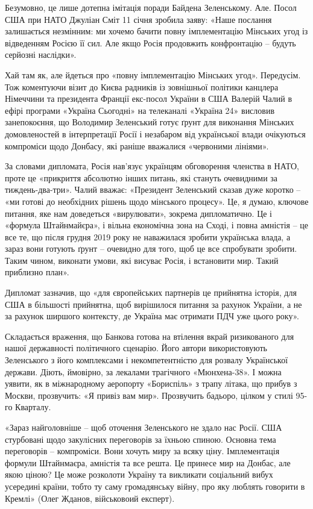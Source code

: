 Безумовно, це лише дотепна імітація поради Байдена Зеленському. Але. Посол США
при НАТО Джуліан Сміт 11 січня зробила заяву: «Наше послання залишається
незмінним: ми хочемо бачити повну імплементацію Мінських угод із відведенням
Росією її сил. Але якщо Росія продовжить конфронтацію – будуть серйозні
наслідки».

Хай там як, але йдеться про «повну імплементацію Мінських угод». Передусім. Тож
коментуючи візит до Києва радників із зовнішньої політики канцлера Німеччини та
президента Франції екс-посол України в США Валерій Чалий в ефірі програми
«Україна Сьогодні» на телеканалі «Україна 24» висловив занепокоєння, що
Володимир Зеленський готує ґрунт для виконання Мінських домовленостей в
інтерпретації Росії і незабаром від української влади очікуються компроміси
щодо Донбасу, які раніше вважалися «червоними лініями».

За словами дипломата, Росія нав’язує українцям обговорення членства в НАТО,
проте це «прикриття абсолютно інших питань, які стануть очевидними за
тиждень-два-три». Чалий вважає: «Президент Зеленський сказав дуже коротко – «ми
готові до необхідних рішень щодо мінського процесу». Це, я думаю, ключове
питання, яке нам доведеться «вирулювати», зокрема дипломатично. Це і «формула
Штайнмайєра», і вільна економічна зона на Сході, і повна амністія – це все те,
що після грудня 2019 року не наважилася зробити українська влада, а зараз вони
готують ґрунт – очевидно для того, щоб це все спробувати зробити. Таким чином,
виконати умови, які висуває Росія, і встановити мир. Такий приблизно план».

Дипломат зазначив, що «для європейських партнерів це прийнятна історія, для США
в більшості прийнятна, щоб вирішилося питання за рахунок України, а не за
рахунок ширшого контексту, де Україна має отримати ПДЧ уже цього року».

Складається враження, що Банкова готова на втілення вкрай ризикованого для
нашої державності політичного сценарію. Його автори використовують Зеленського
з його комплексами і некомпетентністю для розвалу Української держави. Діють,
ймовірно, за лекалами трагічного «Мюнхена-38». І можна уявити, як в
міжнародному аеропорту «Бориспіль» з трапу літака, що прибув з Москви,
прозвучить: «Я привіз вам мир». Прозвучить бадьоро, цілком у стилі 95-го
Кварталу.

«Зараз найголовніше – щоб оточення Зеленського не здало нас Росії. США
стурбовані щодо закулісних переговорів за їхньою спиною. Основна тема
переговорів – компроміси. Вони хочуть миру за всяку ціну. Імплементація формули
Штайнмаєра, амністія та все решта. Це принесе мир на Донбас, але якою ціною? Це
може розколоти Україну та викликати соціальний вибух усередині країни, тобто ту
саму громадянську війну, про яку люблять говорити в Кремлі» (Олег Жданов,
військовоий експерт).

